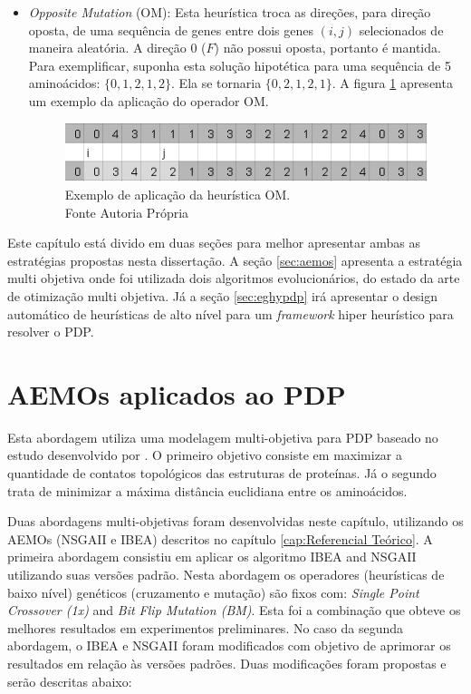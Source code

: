 \begin{itemize}
 	\item \textit{Opposite Mutation} (OM): Esta heurística troca as direções, para direção oposta, de uma sequência de genes entre dois genes $(i,j)$ selecionados de maneira aleatória. A direção 0 ($F$) não possui oposta, portanto é mantida. Para exemplificar, suponha esta solução hipotética para uma sequência de 5 aminoácidos: $\{0,1,2,1,2\}$. Ela se tornaria $\{0,2,1,2,1\}$. A figura \ref{fig:oppositeMutation} apresenta um exemplo da aplicação do operador OM.
 	
 	
 	\begin{figure}[!htb]
 		\centering
 		\includegraphics{Imagens/OppositeMutation.png}
 		\caption{Exemplo de aplicação da heurística OM. \\Fonte Autoria Própria}
 		\label{fig:oppositeMutation}
 	\end{figure}
 	
 	
 	
 \end{itemize} 



 Este capítulo está divido em duas seções para melhor apresentar ambas as estratégias propostas nesta dissertação. A seção \ref{sec:aemos} apresenta a estratégia multi objetiva onde foi utilizada dois algoritmos evolucionários, do estado da arte de otimização multi objetiva. Já a seção  \ref{sec:eghypdp} irá apresentar o design automático de heurísticas de alto nível para um \textit{framework} hiper heurístico para resolver o PDP.

	



\section{AEMOs aplicados ao PDP}
\label{sec:aeoms}

Esta abordagem utiliza uma modelagem multi-objetiva para PDP baseado no estudo desenvolvido por \cite{gabriel2012algoritmos}. O primeiro objetivo consiste em maximizar a quantidade de contatos topológicos das estruturas de proteínas. Já o segundo  trata de minimizar a máxima distância euclidiana entre os aminoácidos. 

Duas abordagens multi-objetivas foram desenvolvidas neste capítulo, utilizando os AEMOs (NSGAII e IBEA) descritos no capítulo \ref{cap:Referencial Teórico}. A primeira abordagem consistiu em aplicar os algoritmo IBEA and NSGAII utilizando suas versões padrão. Nesta abordagem os operadores (heurísticas de baixo nível) genéticos (cruzamento e mutação) são fixos com: \textit{Single Point Crossover (1x)} and \textit{Bit Flip Mutation (BM)}. Esta foi a combinação que obteve os melhores resultados em experimentos preliminares. No caso da segunda abordagem, o IBEA e NSGAII foram modificados com objetivo de aprimorar os resultados em relação às versões padrões. Duas modificações foram propostas e serão descritas abaixo:

